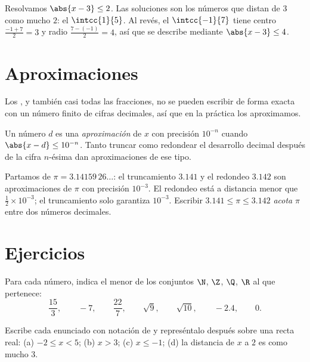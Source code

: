 \begin{example}\label{ex:g10:numbers:abs}
Resolvamos $\abs{x - 3} \leq 2$. Las soluciones son los números que distan
de $3$ como mucho $2$: el  $\intcc{1}{5}$. Al revés, el 
$\intcc{-1}{7}$ tiene centro $\frac{-1+7}{2} = 3$ y radio
$\frac{7-(-1)}{2} = 4$, así que se describe mediante $\abs{x - 3} \leq 4$.
\end{example}

\section{Aproximaciones}

Los , y también casi todas las fracciones, no se pueden
escribir de forma exacta con un número finito de cifras decimales, así que
en la práctica los aproximamos.

\begin{definition}\label{def:g10:numbers:approx}
Un número $d$ es una \emph{aproximación} de $x$ con
precisión $10^{-n}$ cuando $\abs{x - d} \leq 10^{-n}$. Tanto truncar como
redondear el desarrollo decimal después de la cifra $n$-ésima dan
aproximaciones de ese tipo.
\end{definition}

\begin{example}
Partamos de $\pi = 3.14159\,26\dots$: el truncamiento $3.141$ y el
redondeo $3.142$ son aproximaciones de $\pi$ con precisión $10^{-3}$. El
redondeo está a distancia menor que $\frac12 \times 10^{-3}$; el
truncamiento solo garantiza $10^{-3}$. Escribir
$3.141 \leq \pi \leq 3.142$ \emph{acota} $\pi$ entre dos números
decimales.
\end{example}

\section{Ejercicios}

\begin{exercise}[$\star$]\label{exo:g10:numbers:1}
Para cada número, indica el menor de los conjuntos $\N$, $\Z$, $\Q$, $\R$
al que pertenece:
\[
\frac{15}{3}, \qquad -7, \qquad \frac{22}{7}, \qquad \sqrt{9}, \qquad
\sqrt{10}, \qquad -2.4, \qquad 0 .
\]
\end{exercise}

\begin{exercise}[$\star$]\label{exo:g10:numbers:2}
Escribe cada enunciado con notación de  y represéntalo después
sobre una recta real: (a) $-2 \leq x < 5$; (b) $x > 3$; (c) $x \leq -1$;
(d) la distancia de $x$ a $2$ es como mucho $3$.
\end{exercise}

